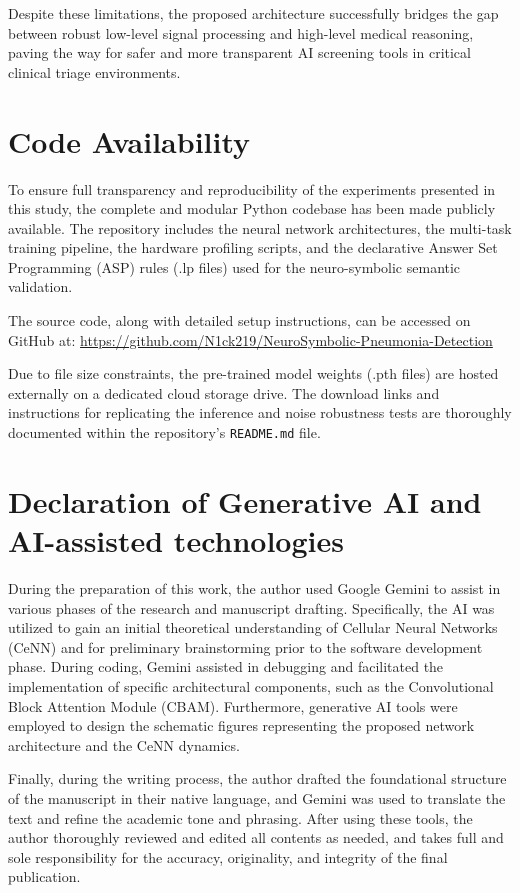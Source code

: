 \documentclass[a4paper,fleqn]{cas-dc}
\begin{document}
Despite these limitations, the proposed architecture successfully bridges the gap between robust low-level signal processing and high-level medical reasoning, paving the way for safer and more transparent AI screening tools in critical clinical triage environments.

\newpage

\section*{Code Availability}
To ensure full transparency and reproducibility of the experiments presented in this study, the complete and modular Python codebase has been made publicly available. The repository includes the neural network architectures, the multi-task training pipeline, the hardware profiling scripts, and the declarative Answer Set Programming (ASP) rules (.lp files) used for the neuro-symbolic semantic validation. 

The source code, along with detailed setup instructions, can be accessed on GitHub at: \url{https://github.com/N1ck219/NeuroSymbolic-Pneumonia-Detection}

Due to file size constraints, the pre-trained model weights (.pth files) are hosted externally on a dedicated cloud storage drive. The download links and instructions for replicating the inference and noise robustness tests are thoroughly documented within the repository's \texttt{README.md} file.

\section*{Declaration of Generative AI and AI-assisted technologies}

During the preparation of this work, the author used Google Gemini to assist in various phases of the research and manuscript drafting. Specifically, the AI was utilized to gain an initial theoretical understanding of Cellular Neural Networks (CeNN) and for preliminary brainstorming prior to the software development phase. During coding, Gemini assisted in debugging and facilitated the implementation of specific architectural components, such as the Convolutional Block Attention Module (CBAM). Furthermore, generative AI tools were employed to design the schematic figures representing the proposed network architecture and the CeNN dynamics. 

Finally, during the writing process, the author drafted the foundational structure of the manuscript in their native language, and Gemini was used to translate the text and refine the academic tone and phrasing. After using these tools, the author thoroughly reviewed and edited all contents as needed, and takes full and sole responsibility for the accuracy, originality, and integrity of the final publication.
\end{document}
